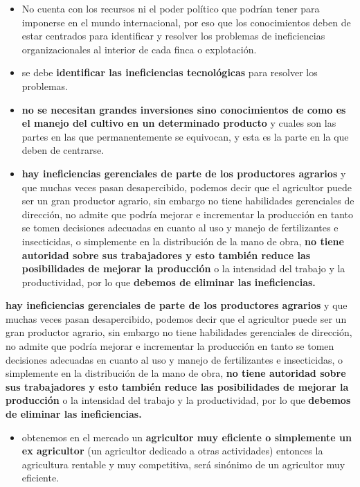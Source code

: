 \documentclass[
  a4paper,
]{article}
\providecommand{\tightlist}{%
  \setlength{\itemsep}{0pt}\setlength{\parskip}{0pt}}\usepackage{longtable,booktabs,array}
\begin{document}
\begin{itemize}
\item
  No cuenta con los recursos ni el poder político que podrían tener para
  imponerse en el mundo internacional, por eso que los conocimientos
  deben de estar centrados para identificar y resolver los problemas de
  ineficiencias organizacionales al interior de cada finca o
  explotación.
\item
  se debe \textbf{identificar las ineficiencias tecnológicas} para
  resolver los problemas.
\item
  \textbf{no se necesitan grandes inversiones sino conocimientos de como
  es el manejo del cultivo en un determinado producto} y cuales son las
  partes en las que permanentemente se equivocan, y esta es la parte en
  la que deben de centrarse.
\item
  \textbf{hay ineficiencias gerenciales de parte de los productores
  agrarios} y que muchas veces pasan desapercibido, podemos decir que el
  agricultor puede ser un gran productor agrario, sin embargo no tiene
  habilidades gerenciales de dirección, no admite que podría mejorar e
  incrementar la producción en tanto se tomen decisiones adecuadas en
  cuanto al uso y manejo de fertilizantes e insecticidas, o simplemente
  en la distribución de la mano de obra, \textbf{no tiene autoridad
  sobre sus trabajadores y esto también reduce las posibilidades de
  mejorar la producción} o la intensidad del trabajo y la productividad,
  por lo que \textbf{debemos de eliminar las ineficiencias.}
\end{itemize}

\textbf{hay ineficiencias gerenciales de parte de los productores
agrarios} y que muchas veces pasan desapercibido, podemos decir que el
agricultor puede ser un gran productor agrario, sin embargo no tiene
habilidades gerenciales de dirección, no admite que podría mejorar e
incrementar la producción en tanto se tomen decisiones adecuadas en
cuanto al uso y manejo de fertilizantes e insecticidas, o simplemente en
la distribución de la mano de obra, \textbf{no tiene autoridad sobre sus
trabajadores y esto también reduce las posibilidades de mejorar la
producción} o la intensidad del trabajo y la productividad, por lo que
\textbf{debemos de eliminar las ineficiencias.}

\begin{itemize}
\tightlist
\item
  obtenemos en el mercado un \textbf{agricultor muy eficiente o
  simplemente un ex agricultor} (un agricultor dedicado a otras
  actividades) entonces la agricultura rentable y muy competitiva, será
  sinónimo de un agricultor muy eficiente.
\end{itemize}
\end{document}
